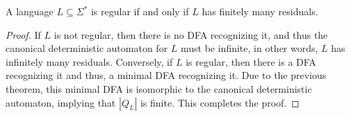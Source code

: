 \begin{theorem}
    A language $L\subseteq\Sigma^*$ is regular if and only if $L$ has finitely many residuals.
\end{theorem}
\begin{proof}
    If $L$ is not regular, then there is no DFA recognizing it, and thus the canonical deterministic automaton for $L$ must be infinite, in other words, $L$ has infinitely many residuals. Conversely, if $L$ is regular, then there is a DFA recognizing it and thus, a minimal DFA recognizing it. Due to the previous theorem, this minimal DFA is isomorphic to the canonical deterministic automaton, implying that $|Q_L|$ is finite. This completes the proof.
\end{proof}

